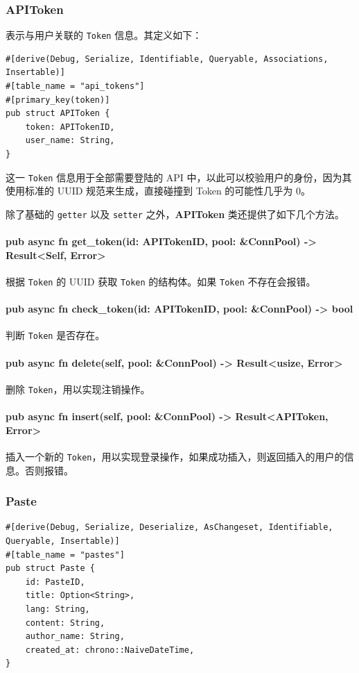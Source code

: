 \documentclass[ichigo,normal,cn]{elegantnote}
\newcommand{\code}[1]{\colorbox{light-gray}{\texttt{#1}}}
\begin{document}
\subsubsection{APIToken}
表示与用户关联的 \code{Token} 信息。其定义如下：
\begin{lstlisting}
#[derive(Debug, Serialize, Identifiable, Queryable, Associations, Insertable)]
#[table_name = "api_tokens"]
#[primary_key(token)]
pub struct APIToken {
    token: APITokenID,
    user_name: String,
}
\end{lstlisting}
这一 \code{Token} 信息用于全部需要登陆的 API 中，以此可以校验用户的身份，因为其使用标准的 UUID 规范来生成，直接碰撞到 Token 的可能性几乎为 0。

除了基础的 \code{getter} 以及 \code{setter} 之外，\textbf{APIToken} 类还提供了如下几个方法。

\paragraph{pub async fn get\_token(id: APITokenID, pool: \&ConnPool) -> Result<Self, Error>}
根据  \code{Token} 的 UUID 获取  \code{Token} 的结构体。如果  \code{Token} 不存在会报错。

\paragraph{pub async fn check\_token(id: APITokenID, pool: \&ConnPool) -> bool}
判断 \code{Token} 是否存在。

\paragraph{pub async fn delete(self, pool: \&ConnPool) -> Result<usize, Error>}
删除 \code{Token}，用以实现注销操作。

\paragraph{pub async fn insert(self, pool: \&ConnPool) -> Result<APIToken, Error>}
插入一个新的 \code{Token}，用以实现登录操作，如果成功插入，则返回插入的用户的信息。否则报错。

\subsubsection{Paste}

\begin{lstlisting}
#[derive(Debug, Serialize, Deserialize, AsChangeset, Identifiable, Queryable, Insertable)]
#[table_name = "pastes"]
pub struct Paste {
    id: PasteID,
    title: Option<String>,
    lang: String,
    content: String,
    author_name: String,
    created_at: chrono::NaiveDateTime,
}
\end{lstlisting}
\end{document}
